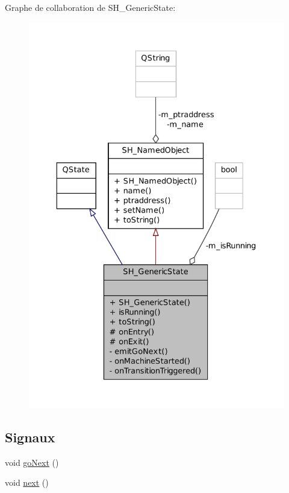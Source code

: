 Graphe de collaboration de S\-H\-\_\-\-Generic\-State\-:
\nopagebreak
\begin{figure}[H]
\begin{center}
\leavevmode
\includegraphics[width=350pt]{classSH__GenericState__coll__graph}
\end{center}
\end{figure}
\subsection*{Signaux}
\begin{DoxyCompactItemize}
\item 
void \hyperlink{classSH__GenericState_a34c1bebc765cc3a62d66c94c37d4f0c3}{go\-Next} ()
\item 
void \hyperlink{classSH__GenericState_ad5e2a1f3dc129336c8f529cf897c2eb0}{next} ()
\end{DoxyCompactItemize}
